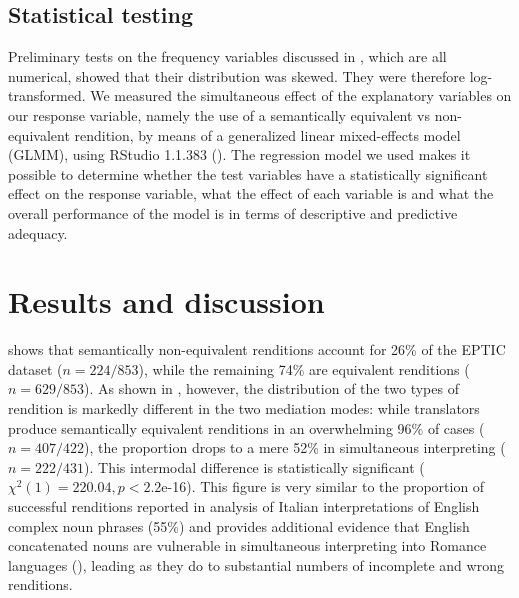 \documentclass[output=paper]{langscibook}
\begin{document}
\subsection{Statistical testing}\label{sec:lefer:3.3}

\begin{sloppypar}
Preliminary tests on the frequency variables discussed in , which are all numerical, showed that their distribution was skewed. They were therefore log-transformed. We measured the simultaneous effect of the explanatory variables on our response variable, namely the use of a semantically equivalent vs non-equivalent rendition, by means of a generalized linear mixed-effects model (GLMM), using RStudio 1.1.383 (\citealt{RCoreTeam2018}). The regression model we used makes it possible to determine whether the test variables have a statistically significant effect on the response variable, what the effect of each variable is and what the overall performance of the model is in terms of descriptive and predictive adequacy.
\end{sloppypar}



\section{Results and discussion}\label{sec:lefer:4}

 shows that semantically non-equivalent renditions account for 26\% of the EPTIC dataset ($n=224/853$), while the remaining 74\% are equivalent renditions ($n=629/853$). As shown in , however, the distribution of the two types of rendition is markedly different in the two mediation modes: while translators produce semantically equivalent renditions in an overwhelming 96\% of cases ($n=407/422$), the proportion drops to a mere 52\% in simultaneous interpreting ($n=222/431$). This intermodal difference is statistically significant ($χ^2 (1)=220.04, p < 2.2$e-16). This figure is very similar to the proportion of successful renditions reported in  analysis of Italian interpretations of English complex noun phrases (55\%) and provides additional evidence that English concatenated nouns are vulnerable in simultaneous interpreting into Romance languages (\citealt[cf.][]{Gile1995}), leading as they do to substantial numbers of incomplete and wrong renditions.
\end{document}
